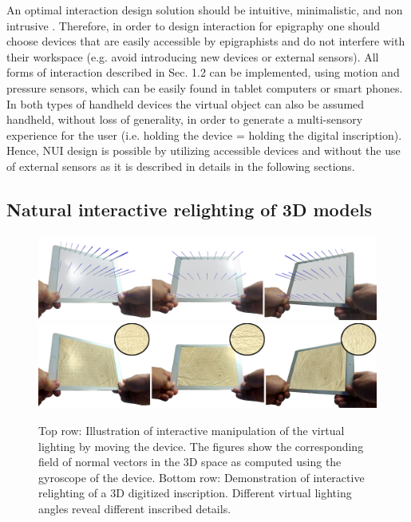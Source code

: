\documentclass[amsthm,ebook]{saparticle}
\begin{document}
An optimal interaction design solution should be intuitive, minimalistic, and non intrusive \citep{preece_interaction_2015}.
Therefore, in order to design interaction for epigraphy one should choose devices that are easily accessible by
epigraphists and do not interfere with their workspace (e.g. avoid introducing new devices or external sensors). All
forms of interaction described in Sec. 1.2 can be implemented, using motion and pressure sensors, which can be easily
found in tablet computers or smart phones. In both types of handheld devices the virtual object can also be assumed
handheld, without loss of generality, in order to generate a multi-sensory experience for the user (i.e. holding the
device = holding the digital inscription). Hence, NUI design is possible by utilizing accessible devices and
without the use of external sensors as it is described in details in the following sections.


\subsection{Natural interactive relighting of 3D models}

\begin{figure}[!hbp]
\centering
 \includegraphics[width=\columnwidth]{EAGLE2016cameraready-img001.png}
 \includegraphics[width=\columnwidth]{EAGLE2016cameraready-img002.png}
\caption{ Top row: Illustration of interactive manipulation of the virtual lighting by moving the device. The figures
show the corresponding field of normal vectors in the 3D space as computed using the gyroscope of the device. Bottom
row: Demonstration of interactive relighting of a 3D digitized inscription. Different virtual lighting angles reveal
different inscribed details. }
\label{fig:1}
\end{figure}
\end{document}
